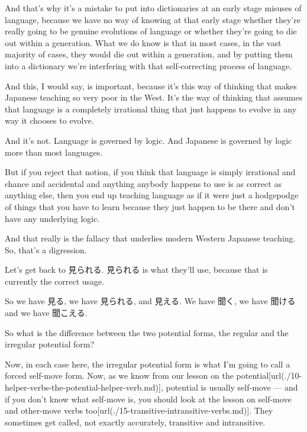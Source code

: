And that's why it's a mistake to put into dictionaries at an early stage misuses of language, because we have no way of knowing at that early stage whether they're really going to be genuine evolutions of language or whether they're going to die out within a generation. What we do know is that in most cases, in the vast majority of cases, they would die out within a generation, and by putting them into a dictionary we're interfering with that self-correcting process of language.

And this, I would say, is important, because it's this way of thinking that makes Japanese teaching so very poor in the West. It's the way of thinking that assumes that language is a completely irrational thing that just happens to evolve in any way it chooses to evolve.

{}

And it's not. Language is governed by logic. And Japanese is governed by logic more than most languages.

But if you reject that notion, if you think that language is simply irrational and chance and accidental and anything anybody happens to use is as correct as anything else, then you end up teaching language as if it were just a hodgepodge of things that you have to learn because they just happen to be there and don't have any underlying logic.

And that really is the fallacy that underlies modern Western Japanese teaching. So, that's a digression.

Let's get back to 見られる. 見られる is what they'll use, because that is currently the correct usage.

So we have 見る, we have 見られる, and 見える. We have 聞く, we have 聞ける and we have 聞こえる.

\startsectionlevel[title={Regular and irregular potential form},reference={regular-and-irregular-potential-form}]

So what is the difference between the two potential forms, the regular and the irregular potential form?

Now, in each case here, the irregular potential form is what I'm going to call a forced self-move form. Now, as we know from our lesson on the potential\goto{{[}10{]}}[url(./10-helper-verbs-the-potential-helper-verb.md)], potential is usually self-move --- and if you don't know what self-move is, you should look at the lesson on self-move and other-move verbs too\goto{{[}15{]}}[url(./15-transitive-intransitive-verbs.md)]. They sometimes get called, not exactly accurately, transitive and intransitive.

